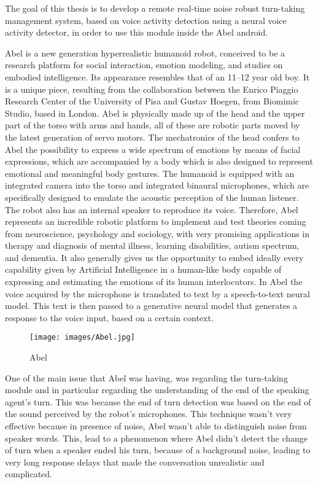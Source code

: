 \documentclass[../main.tex]{subfiles}
\begin{document}
The goal of this thesis is to develop a remote real-time noise robust turn-taking management system, based on voice activity detection using a neural voice activity detector, in order to use this module inside the Abel android. 

Abel is a new generation hyperrealistic humanoid robot, conceived to be a research platform for social interaction, emotion modeling, and studies on embodied intelligence. Its appearance resembles that of an 11–12 year old boy. It is a unique piece, resulting from the collaboration between the Enrico Piaggio Research Center of the University of Pisa and Gustav Hoegen, from Biomimic Studio, based in London. Abel is physically made up of the head and the upper part of the torso with arms and hands, all of these are robotic parts moved by the latest generation of servo motors. The mechatronics of the head confers to Abel the possibility to express a wide spectrum of emotions by means of facial expressions, which are accompanied by a body which is also designed to represent emotional and meaningful body gestures.
The humanoid is equipped with an integrated camera into the torso and integrated binaural microphones, which are specifically designed to emulate the acoustic perception of the human listener. The robot also has an internal speaker to reproduce its voice. Therefore, Abel represents an incredible robotic platform to implement and test theories coming
from neuroscience, psychology and sociology, with very promising applications in therapy and
diagnosis of mental illness, learning disabilities, autism spectrum, and dementia.
It also generally gives us the opportunity to embed ideally every capability given by Artificial
Intelligence in a human-like body capable of expressing and estimating the emotions of its human
interlocutors. In Abel the voice acquired by the microphone is translated to text by a speech-to-text neural model. This text is then passed to a generative neural model that generates a response to the voice input, based on a certain context.  

\begin{figure}[ht]
    \centering
    \texttt{[image: images/Abel.jpg]}
    \caption{Abel}
    \label{fig:abel}
\end{figure}

One of the main issue that Abel was having, was regarding the turn-taking module and in particular regarding the understanding of the end of the speaking agent's turn. This was because the end of turn detection was based on the end of the sound perceived by the robot's microphones. This technique wasn't very effective because in presence of noise, Abel wasn't able to distinguish noise from speaker words. This, lead to a phenomenon where Abel didn't detect the change of turn when a speaker ended his turn, because of a background noise, leading to very long response delays that made the conversation unrealistic and complicated. 
\end{document}
